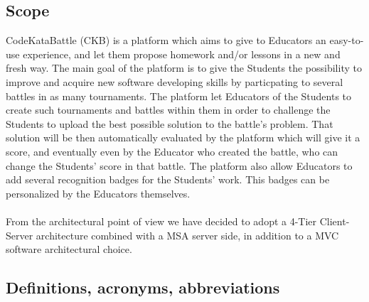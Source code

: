 \documentclass{article}
\begin{document}
\subsection{Scope}
CodeKataBattle (CKB) is a platform which aims to give to Educators an easy-to-use experience, and let
them propose homework and/or lessons in a new and fresh way.
The main goal of the platform is to give the Students the possibility to improve and acquire new software
developing skills by particpating to several battles in as many tournaments.
The platform let Educators of the Students to create such tournaments and battles within them
in order to challenge the Students to upload the best possible solution to the battle's
problem. That solution will be then automatically evaluated by the platform which will give it a score,
and eventually even by the Educator who created the battle, who can change the Students' score 
in that battle. The platform also allow Educators to add several recognition badges for the 
Students' work. This badges can be personalized by the Educators themselves.
\\ \\
From the architectural point of view we have decided to adopt a 4-Tier Client-Server architecture combined
with a MSA server side, in addition to a MVC software architectural choice.
\subsection{Definitions, acronyms, abbreviations}
\end{document}
